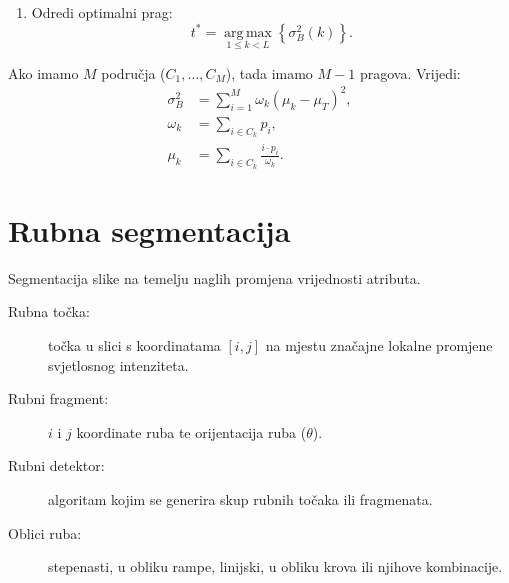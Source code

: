 \documentclass[11pt,english]{article}
\begin{document}
\begin{enumerate}
	\item Odredi optimalni prag:
	$$t^\ast = \operatorname*{arg\,max}_{1\leq k<L} \left \{ \sigma_B^2(k) \right \}.$$
\end{enumerate}
Ako imamo $M$ područja ($C_1, \ldots, C_M$), tada imamo $M-1$ pragova. Vrijedi:
\begin{align*}
	\sigma_B^2 &= \sum_{i=1}^M\omega_k(\mu_k-\mu_T)^2,\\
	\omega_k &= \sum_{i \in C_k} p_i,\\
	\mu_k &= \sum_{i \in C_k} \frac{i\cdot p_i}{\omega_k}.
\end{align*}

\section{Rubna segmentacija}
Segmentacija slike na temelju naglih promjena vrijednosti atributa.
\begin{description}
  \item[Rubna točka:] točka u slici s koordinatama $[i, j]$ na mjestu značajne lokalne promjene svjetlosnog intenziteta.
  \item[Rubni fragment:] $i$ i $j$ koordinate ruba te orijentacija ruba ($\theta$).
  \item[Rubni detektor:] algoritam kojim se generira skup rubnih točaka ili fragmenata.
  \item[Oblici ruba:] stepenasti, u obliku rampe, linijski, u obliku krova ili njihove kombinacije.
\end{description}
\end{document}
